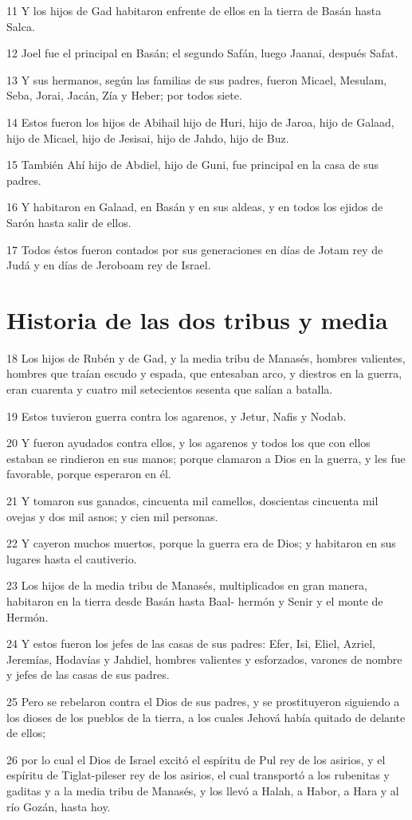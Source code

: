 \par 11 Y los hijos de Gad habitaron enfrente de ellos en la tierra de Basán hasta Salca.
\par 12 Joel fue el principal en Basán; el segundo Safán, luego Jaanai, después Safat.
\par 13 Y sus hermanos, según las familias de sus padres, fueron Micael, Mesulam, Seba, Jorai, Jacán, Zía y Heber; por todos siete.
\par 14 Estos fueron los hijos de Abihail hijo de Huri, hijo de Jaroa, hijo de Galaad, hijo de Micael, hijo de Jesisai, hijo de Jahdo, hijo de Buz.
\par 15 También Ahí hijo de Abdiel, hijo de Guni, fue principal en la casa de sus padres.
\par 16 Y habitaron en Galaad, en Basán y en sus aldeas, y en todos los ejidos de Sarón hasta salir de ellos.
\par 17 Todos éstos fueron contados por sus generaciones en días de Jotam rey de Judá y en días de Jeroboam rey de Israel.

\section*{Historia de las dos tribus y media}

\par 18 Los hijos de Rubén y de Gad, y la media tribu de Manasés, hombres valientes, hombres que traían escudo y espada, que entesaban arco, y diestros en la guerra, eran cuarenta y cuatro mil setecientos sesenta que salían a batalla.
\par 19 Estos tuvieron guerra contra los agarenos, y Jetur, Nafis y Nodab.
\par 20 Y fueron ayudados contra ellos, y los agarenos y todos los que con ellos estaban se rindieron en sus manos; porque clamaron a Dios en la guerra, y les fue favorable, porque esperaron en él.
\par 21 Y tomaron sus ganados, cincuenta mil camellos, doscientas cincuenta mil ovejas y dos mil asnos; y cien mil personas.
\par 22 Y cayeron muchos muertos, porque la guerra era de Dios; y habitaron en sus lugares hasta el cautiverio.
\par 23 Los hijos de la media tribu de Manasés, multiplicados en gran manera, habitaron en la tierra desde Basán hasta Baal- hermón y Senir y el monte de Hermón.
\par 24 Y estos fueron los jefes de las casas de sus padres: Efer, Isi, Eliel, Azriel, Jeremías, Hodavías y Jahdiel, hombres valientes y esforzados, varones de nombre y jefes de las casas de sus padres.
\par 25 Pero se rebelaron contra el Dios de sus padres, y se prostituyeron siguiendo a los dioses de los pueblos de la tierra, a los cuales Jehová había quitado de delante de ellos;
\par 26 por lo cual el Dios de Israel excitó el espíritu de Pul rey de los asirios, y el espíritu de Tiglat-pileser rey de los asirios, el cual transportó a los rubenitas y gaditas y a la media tribu de Manasés, y los llevó a Halah, a Habor, a Hara y al río Gozán, hasta hoy. 

